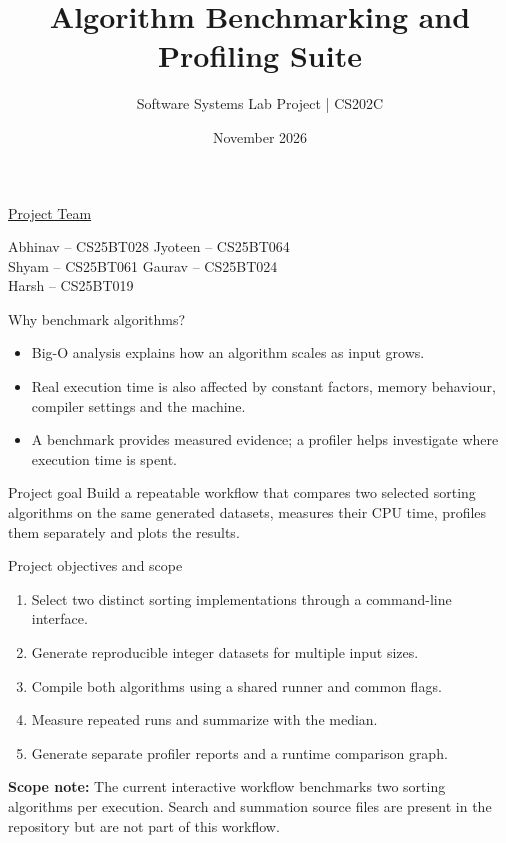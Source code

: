 \documentclass[aspectratio=169,11pt]{beamer}
\title[Algorithm Benchmarking Suite]{Algorithm Benchmarking and Profiling Suite}
\subtitle{Software Systems Lab Project \;|\; CS202C}
\institute{\large Indian Institute of Technology Dharwad\\Faculty: Dr. Suman Dutta}
\date{November 2026}
\begin{document}
\begin{frame}[plain]
\titlepage
\vspace{-0.4cm}
\centering \underline{Project Team}
\begin{center}
\small
Abhinav -- CS25BT028 \quad Jyoteen -- CS25BT064\\
Shyam -- CS25BT061 \quad Gaurav -- CS25BT024\\
Harsh -- CS25BT019
\end{center}
\end{frame}
\begin{frame}{Why benchmark algorithms?}
\begin{itemize}
\item Big-O analysis explains how an algorithm scales as input grows.
\item Real execution time is also affected by constant factors, memory behaviour, compiler settings and the machine.
\item A benchmark provides measured evidence; a profiler helps investigate where execution time is spent.
\end{itemize}
\begin{block}{Project goal}
Build a repeatable workflow that compares two selected sorting algorithms on the same generated datasets, measures their CPU time, profiles them separately and plots the results.
\end{block}
\end{frame}
\begin{frame}{Project objectives and scope}
\begin{enumerate}
\item Select two distinct sorting implementations through a command-line interface.
\item Generate reproducible integer datasets for multiple input sizes.
\item Compile both algorithms using a shared runner and common flags.
\item Measure repeated runs and summarize with the median.
\item Generate separate profiler reports and a runtime comparison graph.
\end{enumerate}
\vspace{0.3cm}
\textbf{Scope note:} The current interactive workflow benchmarks two sorting algorithms per execution. Search and summation source files are present in the repository but are not part of this workflow.
\end{frame}
\end{document}
